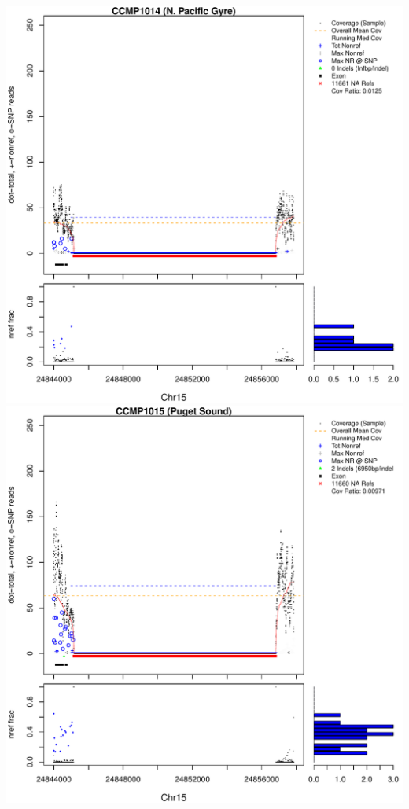 \documentclass{article}\usepackage[]{graphicx}\usepackage[]{color}
\makeatletter
\def\maxwidth{ %
  \ifdim\Gin@nat@width>\linewidth
    \linewidth
  \else
    \Gin@nat@width
  \fi
}
\newenvironment{knitrout}{}{} %
\makeatother
\begin{document}
\begin{knitrout}
{\includegraphics[width=\maxwidth]{figs-knitr/unnamed-chunk-57-5} 
\includegraphics[width=\maxwidth]{figs-knitr/unnamed-chunk-57-6} 
}
\end{knitrout}
\end{document}
